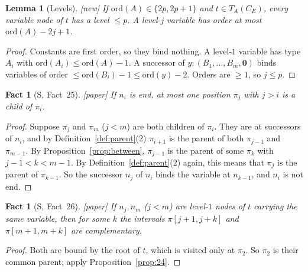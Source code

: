 \documentclass[11pt]{article}
\newcommand{\Ground}{\mathbf{0}}
\newcommand{\ord}{\mathrm{ord}}
\newcommand{\iv}[2]{\pi[#1,#2]}
\newcommand{\CE}{C_E}
\newcommand{\Paper}{\textsf{[paper]}}
\newcommand{\New}{\textsf{[new]}}
\theoremstyle{plain}
\newtheorem{lemma}[theorem]{Lemma}
\newtheorem{fact}[theorem]{Fact}
\theoremstyle{definition}
\theoremstyle{remark}
\begin{document}
\begin{lemma}[Levels]\label{lem:levels}
\New{} If $\ord(A)\in\{2p,2p+1\}$ and $t\in T_A(\CE)$, every variable
node of $t$ has a level $\le p$.  A level-$j$ variable has order at
most $\ord(A)-2j+1$.
\end{lemma}
\begin{proof}
Constants are first order, so they bind nothing.  A level-$1$ variable
has type $A_i$ with $\ord(A_i)\le\ord(A)-1$.  A successor of
$y:(B_1,\dots,B_m,\Ground)$ binds variables of order
$\le\ord(B_i)-1\le\ord(y)-2$.  Orders are $\ge1$, so $j\le p$.
\end{proof}

\begin{fact}[S, Fact~25]\label{fact:25}
\Paper{} If $n_i$ is end, at most one position $\pi_j$ with $j>i$ is a
child of $\pi_i$.
\end{fact}
\begin{proof}
Suppose $\pi_j$ and $\pi_m$ ($j<m$) are both children of $\pi_i$.  They
are at successors of $n_i$, and by Definition~\ref{def:parent}(2)
$\pi_{i+1}$ is the parent of both $\pi_{j-1}$ and $\pi_{m-1}$.  By
Proposition~\ref{prop:between}, $\pi_{j-1}$ is the parent of some
$\pi_k$ with $j-1<k<m-1$.  By Definition~\ref{def:parent}(2) again, this
means that $\pi_j$ is the parent of $\pi_{k-1}$.  So the successor $n_j$
of $n_i$ binds the variable at $n_{k-1}$, and $n_i$ is not end.
\end{proof}

\begin{fact}[S, Fact~26]\label{fact:26}
\Paper{} If $n_j,n_m$ ($j<m$) are level-$1$ nodes of $t$ carrying the same
variable, then for some $k$ the intervals $\iv{j+1}{j+k}$ and
$\iv{m+1}{m+k}$ are complementary.
\end{fact}
\begin{proof}
Both are bound by the root of $t$, which is visited only at $\pi_2$.  So
$\pi_2$ is their common parent; apply Proposition~\ref{prop:24}.
\end{proof}
\end{document}
